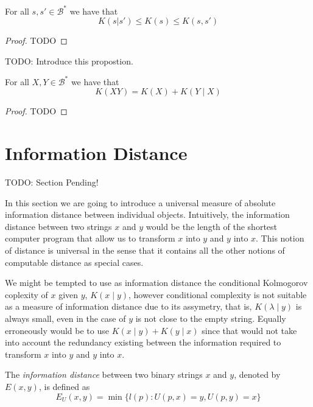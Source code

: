 \begin{proposition}
\label{prop:kolmogorov_relations}
For all $s, s'\in\mathcal{B}^{\ast}$ we have that
\[
K(s | s' ) \leq K(s) \leq K(s, s')
\]
\end{proposition}
\begin{proof}
{\color{red} TODO}
\end{proof}

{\color{red} TODO: Introduce this propostion.}

\begin{proposition}
\label{prop:kolmogorov_relations}
For all $X, Y\in\mathcal{B}^{\ast}$ we have that
\[
K(XY) = K(X) + K(Y \mid X)
\]
\end{proposition}
\begin{proof}
{\color{red} TODO}
\end{proof}

%
%

\section{Information Distance}
\label{sec:information_distance}

{\color{red} TODO: Section Pending!}

In this section we are going to introduce a universal measure of absolute information distance between individual objects. Intuitively, the information distance between two strings $x$ and $y$ would be the length of the shortest computer program that allow us to transform $x$ into $y$ and $y$ into $x$. This notion of distance is universal in the sense that it contains all the other notions of computable distance as special cases.

We might be tempted to use as information distance the conditional Kolmogorov coplexity of $x$ given $y$, $K(x \mid y)$, however conditional complexity is not suitable as a measure of information distance due to its assymetry, that is, $K( \lambda \mid y)$ is always small, even in the case of $y$ is not close to the empty string. Equally erroneously would be to use $K(x \mid y) + K(y \mid x)$ since that would not take into account the redundancy existing between the information required to transform $x$ into $y$ and $y$ into $x$.

\begin{definition}
The \emph{information distance} between two binary strings $x$ and $y$, denoted by $E(x, y)$, is defined as
\[
E_U(x, y) = \min \{ l(p) : U(p, x) = y, U(p, y) = x \}
\]
\end{definition}

